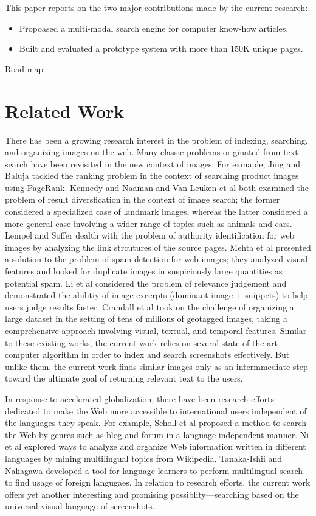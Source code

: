 \documentclass{www2010-submission}
\begin{document}
This paper reports on the two major contributions made by the current research:
\begin{itemize}
\item Propoased a multi-modal search engine for computer know-how articles.
\item Built and evaluated a prototype system with more than 150K unique
pages.
\end{itemize}

Road map

\section{Related Work}

There has been a growing research interest in the problem of indexing,
searching, and organizing images on the web.  Many classic problems
originated from text search have been revisited in the new context of
images. For exmaple, Jing and Baluja \cite{Jing} tackled the ranking
problem in the context of searching product images using PageRank.
Kennedy and Naaman \cite{Kennedy} and Van Leuken et al
\cite{vanLeuken} both examined the problem of result diversfication in
the context of image search; the former considered a specialized case
of landmark images, whereas the latter considered a more general case
involving a wider range of topics such as animals and cars. Lempel and
Soffer \cite{Lempel} dealth with the problem of authority
identification for web images by analyzing the link strcutures of the
source pages.  Mehta et al \cite{Mehta} presented a solution to the
problem of spam detection for web images; they analyzed visual
features and looked for duplicate images in suspiciously large
quantities as potential spam.  Li et al \cite{Li} considered the
problem of relevance judgement and demonstrated the abilitiy of image
excerpts (dominant image + snippets) to help users judge results
faster. Crandall et al \cite{Crandall} took on the challenge of
organizing a large dataset in the setting of tens of millions of
geotagged images, taking a comprehensive approach involving visual,
textual, and temporal features. Similar to these existing works, the
current work relies on several state-of-the-art computer algorithm in
order to index and search screenshots effectively. But unlike them,
the current work finds similar images only as an intermmediate step
toward the ultimate goal of returning relevant text to the users.

In response to accelerated globalization, there have been research
efforts dedicated to make the Web more accessible to international
users independent of the languages they speak. For example, Scholl et
al \cite{Scholl} proposed a method to search the Web by genres such as
blog and forum in a language independent manner. Ni et al \cite{Ni}
explored ways to analyze and organize Web information written in
different languages by mining multilingual topics from
Wikipedia. Tanaka-Ishii and Nakagawa \cite{Tanaka-Ishii} developed a
tool for language learners to perform multilingual search to find
usage of foreign langugaes. In relation to research efforts,
the current work offers yet another interesting and promising
possiblity---searching based on the universal
visual language of screenshots.
\end{document}
